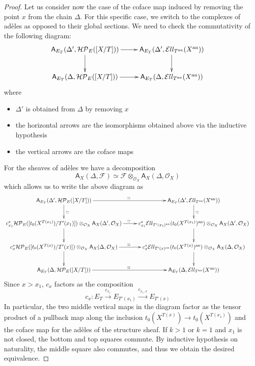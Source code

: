 \documentclass[11pt,letterpaper]{amsart}
\newcommand{\bfA}{\mathsf{A}}
\newcommand{\cF}{\mathcal{F}}
\newcommand{\cO}{\mathcal{O}}
\newcommand{\cHP}{\mathcal{HP}}
\newcommand{\El}{\mathcal{E}ll}
\newcommand{\an}{\mathrm{an}}
\begin{document}
\begin{proof}
Let us consider now the case of the coface map induced by removing the point $x$ from the chain $\Delta$. For this specific case, we switch to the complexes of ad\`eles as opposed to their global sections. 
We need to check the commutativity of the following diagram:
$$\xymatrix{
\bfA_{E_T}(\Delta', \cHP_E([X/T]))\ar[r]\ar[d] & \bfA_{E_T}(\Delta', \El_{T^{\an}}(X^{\an}))\ar[d] \\
\bfA_{E_T}(\Delta, \cHP_E([X/T]))\ar[r] & \bfA_{E_T}(\Delta, \El_{T^{\an}}(X^{\an}))
}
$$
where
\begin{itemize}
\item $\Delta'$ is obtained from $\Delta$ by removing $x$  \item  the horizontal arrows are the isomorphisms obtained above via the inductive hypothesis 
\item the vertical arrows are the coface maps
\end{itemize} For the sheaves of ad\`eles we have a decomposition
$$\bfA_{X}(\Delta, \cF)\simeq\cF\otimes_{\cO_X}\bfA_{X}(\Delta, \cO_X)$$
which allows us to write the above diagram as 
$$\xymatrix{
\bfA_{E_T}(\Delta', \cHP_E([X/T]))\ar[r]^{\simeq}\ar[d]^{\simeq} & \bfA_{E_T}(\Delta', \El_{T^{\an}}(X^{\an}))\ar[d]^{\simeq} \\
c_{x_1}^{\ast}\cHP_E([t_0(X^{T(x_1)})/T'(x_1)])\otimes_{\cO_X}\bfA_{X}(\Delta', \cO_X)\ar[r]^{\simeq}\ar[d] & c_{x_1}^{\ast}\El_{T'(x_1)^{\an}}(t_0(X^{T(x_1)})^{\an})\otimes_{\cO_X}\bfA_{X}(\Delta', \cO_X)\ar[d] \\
c_{x}^{\ast}\cHP_E([t_0(X^{T(x)})/T'(x)])\otimes_{\cO_X}\bfA_{X}(\Delta, \cO_X)\ar[r]^{\simeq}\ar[d] & c_{x}^{\ast}\El_{T'(x)^{\an}}(t_0(X^{T(x)})^{\an})\otimes_{\cO_X}\bfA_{X}(\Delta, \cO_X)\ar[d] \\
\bfA_{E_T}(\Delta, \cHP_E([X/T]))\ar[r]^{\simeq} & \bfA_{E_T}(\Delta, \El_{T^{\an}}(X^{\an}))
}
$$
Since $x>x_1$, $c_x$ factors as the composition
$$c_x:E_T\xrightarrow{c_{x_1}}E_{T'(x_1)}\xrightarrow{c_{x_1,x}}E_{T'(x)}$$
In particular, the two middle vertical maps in the diagram factor as the tensor product of a pullback map 
along the inclusion $t_0(X^{T(x)})\to t_0(X^{T(x_1)})$
and the coface map for the ad\`eles of the structure sheaf. If $k>1$ or $k=1$ and $x_1$ is not closed, the bottom and top squares commute. By inductive hypothesis on naturality, the middle square also commutes, and thus we obtain the desired equivalence.


\end{proof}
\end{document}
